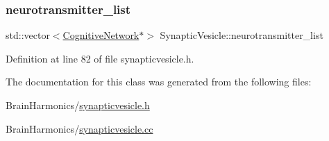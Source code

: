 \subsubsection{\texorpdfstring{neurotransmitter\+\_\+list}{neurotransmitter\_list}}
{\footnotesize\ttfamily std\+::vector$<$\hyperlink{class_cognitive_network}{Cognitive\+Network}$\ast$$>$ Synaptic\+Vesicle\+::neurotransmitter\+\_\+list\hspace{0.3cm}{\ttfamily [protected]}}



Definition at line 82 of file synapticvesicle.\+h.



The documentation for this class was generated from the following files\+:\begin{DoxyCompactItemize}
\item 
Brain\+Harmonics/\hyperlink{synapticvesicle_8h}{synapticvesicle.\+h}\item 
Brain\+Harmonics/\hyperlink{synapticvesicle_8cc}{synapticvesicle.\+cc}\end{DoxyCompactItemize}
